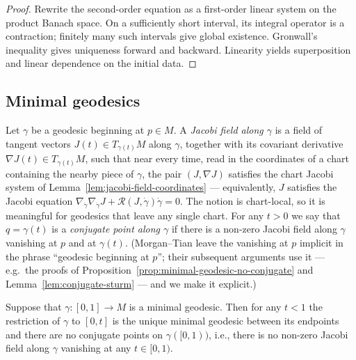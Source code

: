 \begin{proof}
\sketch
\leanok
Rewrite the second-order equation as a first-order linear system on the product Banach space. On a sufficiently short interval, its integral operator is a contraction; finitely many such intervals give global existence. Gronwall's inequality gives uniqueness forward and backward. Linearity yields superposition and linear dependence on the initial data.
\end{proof}

\subsection{Minimal geodesics}

\begin{definition}
\label{def:conjugate-point}
\leanok



Let $\gamma$ be a geodesic beginning at $p\in M$. A {\sl Jacobi field
along $\gamma$} is a field of tangent vectors $J(t)\in T_{\gamma(t)}M$
along $\gamma$, together with its covariant derivative
$\nabla J(t)\in T_{\gamma(t)}M$, such that near every time, read in the
coordinates of a chart containing the nearby piece of $\gamma$, the pair
$(J,\nabla J)$ satisfies the chart Jacobi system of
Lemma~\ref{lem:jacobi-field-coordinates} — equivalently, $J$ satisfies
the Jacobi equation
$\nabla_{\dot\gamma}\nabla_{\dot\gamma}J
+{\mathcal R}(J,\dot\gamma)\dot\gamma=0$. The notion is chart-local, so
it is meaningful for geodesics that leave any single chart. For any
$t>0$ we say that $q=\gamma(t)$ is a {\sl conjugate point along
$\gamma$} if there is a non-zero Jacobi field
along $\gamma$ vanishing at $p$ and at $\gamma(t)$. (Morgan--Tian leave
the vanishing at $p$ implicit in the phrase ``geodesic beginning at
$p$''; their subsequent arguments use it — e.g.\ the proofs of
Proposition~\ref{prop:minimal-geodesic-no-conjugate} and
Lemma~\ref{lem:conjugate-sturm} — and we make it explicit.)
\end{definition}


\begin{proposition}
\label{prop:minimal-geodesic-no-conjugate}
\label{jacmin}



Suppose that $\gamma\colon [0,1]\to M$ is a minimal geodesic. Then
for any $t<1$ the restriction of $\gamma$ to $[0,t]$ is the unique
minimal geodesic between its endpoints and there are no conjugate
points on $\gamma([0,1))$, i.e., there is no non-zero Jacobi field
along $\gamma$ vanishing at any $t\in [0,1)$.
\end{proposition}

